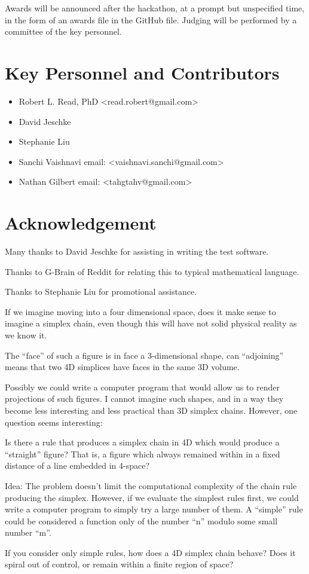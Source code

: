 \documentclass[11pt]{article}
\begin{document}
Awards will be announced after the hackathon, at a prompt but unspecified time, in the form of an
awards file in the GitHub file. Judging will be performed by a committee of the key personnel.

\section{Key Personnel and Contributors}

\begin{itemize}
\item Robert L. Read, PhD  \textless read.robert@gmail.com\textgreater
\item David Jeschke
\item Stephanie Liu
\item Sanchi Vaishnavi email: \textless vaishnavi.sanchi@gmail.com\textgreater
  \item Nathan Gilbert email: \textless tahgtahv@gmail.com\textgreater
\end{itemize}


\section{Acknowledgement}

Many thanks to David Jeschke for assisting in writing the test software.

Thanks to G-Brain of Reddit for relating this to typical mathematical language.

Thanks to Stephanie Liu for promotional assistance.


If we imagine moving into a four dimensional space, does it make sense to imagine a simplex chain, even though this will have
not solid physical reality as we know it.

The ``face'' of such a figure is in face a 3-dimensional shape, can ``adjoining'' means that two 4D simplices have faces in the same 3D volume.

Possibly we could write a computer program that would allow us to render projections of such figures.
I cannot imagine such shapes, and in a way they become less interesting and less practical than 3D simplex chains.
However, one question seems interesting:

Is there a rule that produces a simplex chain in 4D which would produce a ``straight'' figure?
That is, a figure which always remained within in a fixed distance of a line embedded in 4-space?

Idea: The problem doesn't limit the computational complexity of the chain rule producing the simplex.
However, if we evaluate the simplest rules first, we could write a computer program to simply try a large number
of them. A ``simple'' rule could be considered a function only of the number ``n'' modulo some small number ``m''.

If you consider only simple rules, how does a 4D simplex chain behave? Does it spiral out of control, or remain within
a finite region of space? 




\end{document}
